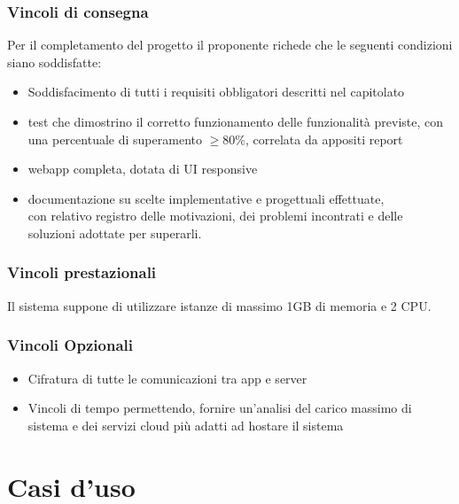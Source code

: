 \documentclass[12pt]{article}
\begin{document}
\subsubsection{Vincoli di consegna}
Per il completamento del progetto il proponente richede che le seguenti condizioni siano soddisfatte:
\begin{itemize}
	\item Soddisfacimento di tutti i requisiti obbligatori descritti nel capitolato
	\item test che dimostrino il corretto funzionamento delle funzionalità previste, con una percentuale di superamento \begin{math}\geq 80\% \end{math}, correlata da appositi report
	\item webapp completa, dotata di UI responsive
	\item documentazione su scelte implementative e progettuali effettuate,\\ con relativo registro delle motivazioni, dei problemi incontrati e delle soluzioni adottate per superarli.
\end{itemize}

\subsubsection{Vincoli prestazionali}
Il sistema suppone di utilizzare istanze di massimo 1GB di memoria e 2 CPU.

\subsubsection{Vincoli Opzionali}
\begin{itemize}
	\item Cifratura di tutte le comunicazioni tra app e server
	\item Vincoli di tempo permettendo, fornire un'analisi del carico massimo di sistema e dei servizi cloud più adatti ad hostare il sistema
\end{itemize}


\section{Casi d'uso}
\end{document}
